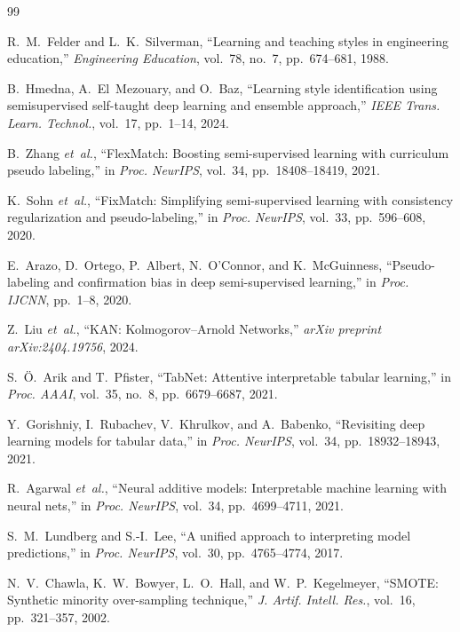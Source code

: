 \documentclass[journal, onecolumn]{IEEEtran}
\begin{document}
\begin{thebibliography}{99}

R.~M.~Felder and L.~K.~Silverman,
``Learning and teaching styles in engineering education,''
\textit{Engineering Education}, vol.~78, no.~7, pp.~674--681, 1988.

B.~Hmedna, A.~El~Mezouary, and O.~Baz,
``Learning style identification using semisupervised self-taught deep learning and ensemble approach,''
\textit{IEEE Trans. Learn. Technol.}, vol.~17, pp.~1--14, 2024.

B.~Zhang \textit{et~al.},
``{FlexMatch}: Boosting semi-supervised learning with curriculum pseudo labeling,''
in \textit{Proc. NeurIPS}, vol.~34, pp.~18408--18419, 2021.

K.~Sohn \textit{et~al.},
``{FixMatch}: Simplifying semi-supervised learning with consistency regularization and pseudo-labeling,''
in \textit{Proc. NeurIPS}, vol.~33, pp.~596--608, 2020.

E.~Arazo, D.~Ortego, P.~Albert, N.~O'Connor, and K.~McGuinness,
``Pseudo-labeling and confirmation bias in deep semi-supervised learning,''
in \textit{Proc. IJCNN}, pp.~1--8, 2020.

Z.~Liu \textit{et~al.},
``{KAN}: {K}olmogorov--{A}rnold Networks,''
\textit{arXiv preprint arXiv:2404.19756}, 2024.

S.~\"{O}.~Arik and T.~Pfister,
``{TabNet}: Attentive interpretable tabular learning,''
in \textit{Proc. AAAI}, vol.~35, no.~8, pp.~6679--6687, 2021.

Y.~Gorishniy, I.~Rubachev, V.~Khrulkov, and A.~Babenko,
``Revisiting deep learning models for tabular data,''
in \textit{Proc. NeurIPS}, vol.~34, pp.~18932--18943, 2021.

R.~Agarwal \textit{et~al.},
``Neural additive models: Interpretable machine learning with neural nets,''
in \textit{Proc. NeurIPS}, vol.~34, pp.~4699--4711, 2021.

S.~M.~Lundberg and S.-I.~Lee,
``A unified approach to interpreting model predictions,''
in \textit{Proc. NeurIPS}, vol.~30, pp.~4765--4774, 2017.

N.~V.~Chawla, K.~W.~Bowyer, L.~O.~Hall, and W.~P.~Kegelmeyer,
``{SMOTE}: Synthetic minority over-sampling technique,''
\textit{J. Artif. Intell. Res.}, vol.~16, pp.~321--357, 2002.


\end{thebibliography}
\end{document}
